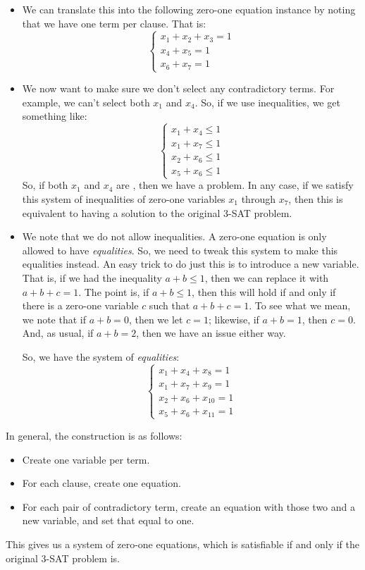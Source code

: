 \documentclass[letterpaper]{article}
\begin{document}
\begin{itemize}
    \item We can translate this into the following zero-one equation instance by noting that we have one term per clause. That is: 
    \[\begin{cases}
        x_1 + x_2 + x_3 = 1 \\ 
        x_4 + x_5 = 1 \\ 
        x_6 + x_7 = 1
    \end{cases}\]
    \item We now want to make sure we don't select any contradictory terms. For example, we can't select both $x_1$ and $x_4$. So, if we use inequalities, we get something like: 
    \[\begin{cases}
        x_1 + x_4 \leq 1 \\ 
        x_1 + x_7 \leq 1 \\ 
        x_2 + x_6 \leq 1 \\ 
        x_5 + x_6 \leq 1
    \end{cases}\]
    So, if both $x_1$ and $x_4$ are , then we have a problem. In any case, if we satisfy this system of inequalities of zero-one variables $x_1$ through $x_7$, then this is equivalent to having a solution to the original 3-SAT problem. 
    \item We note that we do not allow inequalities. A zero-one equation is only allowed to have \emph{equalities}. So, we need to tweak this system to make this equalities instead. An easy trick to do just this is to introduce a new variable. That is, if we had the inequality $a + b \leq 1$, then we can replace it with $a + b + c = 1$. The point is, if $a + b \leq 1$, then this will hold if and only if there is a zero-one variable $c$ such that $a + b + c = 1$. To see what we mean, we note that if $a + b = 0$, then we let $c = 1$; likewise, if $a + b = 1$, then $c = 0$. And, as usual, if $a + b = 2$, then we have an issue either way. 
    
    \bigskip 

    So, we have the system of \emph{equalities}: 
    \[\begin{cases}
        x_1 + x_4 + x_8 = 1 \\ 
        x_1 + x_7 + x_9 = 1 \\ 
        x_2 + x_6 + x_{10} = 1 \\ 
        x_5 + x_6 + x_{11} = 1
    \end{cases}\]
\end{itemize}
In general, the construction is as follows: 
\begin{itemize}
    \item Create one variable per term. 
    \item For each clause, create one equation. 
    \item For each pair of contradictory term, create an equation with those two and a new variable, and set that equal to one. 
\end{itemize}
This gives us a system of zero-one equations, which is satisfiable if and only if the original 3-SAT problem is. 
\end{document}
